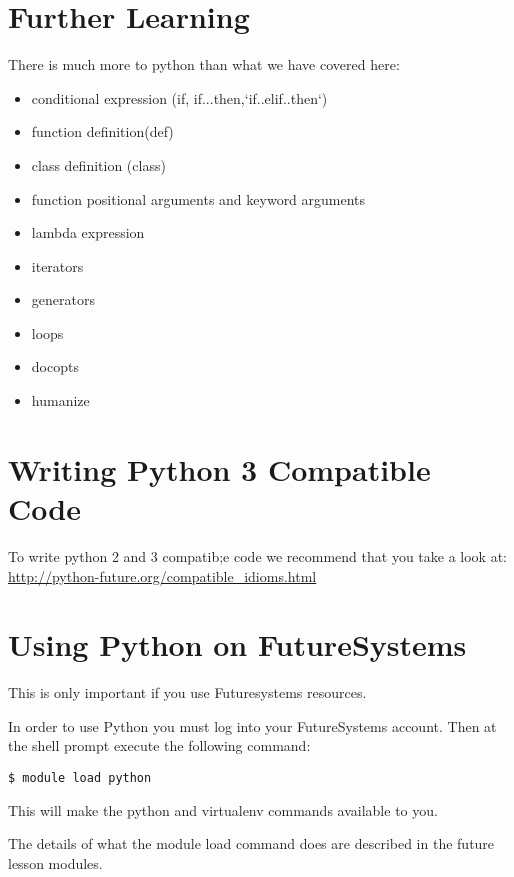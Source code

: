 \section{Further Learning}\label{further-learning}

There is much more to python than what we have covered here:

\begin{itemize}
\tightlist
\item
  conditional expression (if, if...then,`if..elif..then`)
\item
  function definition(def)
\item
  class definition (class)
\item
  function positional arguments and keyword arguments
\item
  lambda expression
\item
  iterators
\item
  generators
\item
  loops
\item
  docopts
\item
  humanize
\end{itemize}

\section{Writing Python 3 Compatible
Code}\label{writing-python-3-compatible-code}

To write python 2 and 3 compatib;e code we recommend that you take a
look at: \url{http://python-future.org/compatible_idioms.html}

\section{Using Python on
FutureSystems}\label{using-python-on-futuresystems}

This is only important if you use Futuresystems resources.

In order to use Python you must log into your FutureSystems account.
Then at the shell prompt execute the following command:

\begin{verbatim}
$ module load python
\end{verbatim}

This will make the python and virtualenv commands available to you.

The details of what the module load command does are described in the
future lesson modules.

